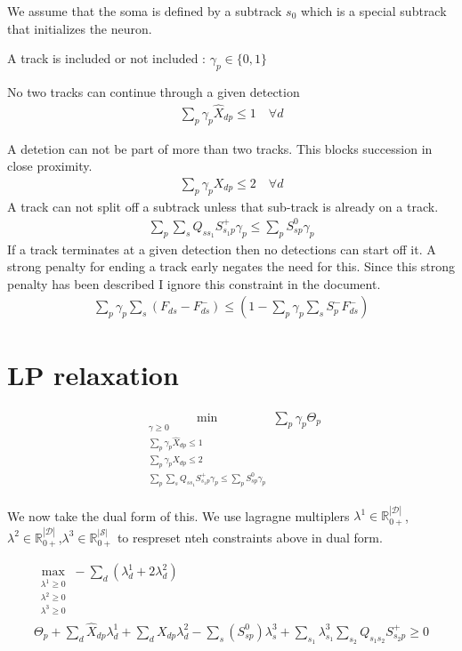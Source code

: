 \documentclass{article}
\begin{document}
We assume that the soma is defined by a subtrack $s_0$ which is a special subtrack that initializes the neuron.  
 
 A track is included or not included :  $\gamma_p \in \{0,1\}$
 
 No two tracks can continue through a given detection
 \begin{align}
 \sum_p \gamma_p\hat{X}_{dp}\leq 1 \quad \forall d
 \end{align}
 
 A detetion can not be part of more than two tracks.  This blocks succession in close proximity.  
  \begin{align}
 \sum_p \gamma_p X_{dp}\leq 2 \quad \forall d
 \end{align}
%
 A track can not split off a subtrack unless that sub-track is already on a track. 
 \begin{align}
 \sum_p \sum_{s}Q_{ss_1}S^+_{s_1p}\gamma_p \leq \sum_p S^0_{sp}\gamma_p %
 \end{align}
 If a track terminates at a given detection then no detections can start off it.  A strong penalty for ending a track early negates the need for this.  Since this strong penalty has been described  I ignore this constraint in the document.  
 \begin{align}
\sum_p\gamma_p\sum_s(F_{ds}-F^-_{ds}) \leq (1-\sum_p\gamma_p\sum_s S^-_pF^-_{ds})
 \end{align}
 
 \section{LP relaxation}
 
  \begin{align}
 \min_{\substack{\gamma \geq 0\\   \sum_p \gamma_p\hat{X}_{dp}\leq 1\\ \sum_p \gamma_p X_{dp}\leq 2 \\ \sum_p \sum_{s}Q_{ss_1}S^+_{s_1p}\gamma_p \leq \sum_p S^0_{sp}\gamma_p }}\sum_p \gamma_p\Theta_p
 \end{align}
 
 We now take the dual form of this.  We use lagragne multiplers $\lambda^1 \in \mathbb{R}_{0+}^{|\mathcal{D}|}$,$\lambda^2 \in \mathbb{R}_{0+}^{|\mathcal{D}|}$,$\lambda^3 \in \mathbb{R}_{0+}^{|\mathcal{S}|}$ to respreset nteh constraints above in dual form.  
 
 \begin{align}
 \max_{\substack{\lambda^1 \geq 0\\ \lambda^2 \geq 0 \\ \lambda^3 \geq 0 }}-\sum_d(\lambda^1_d+2\lambda^2_d) \\
 \Theta_p +\sum_d \hat{X}_{dp}\lambda^1_d+\sum_d X_{dp}\lambda^2_d -\sum_{s}(S^0_{sp})\lambda^3_s+ \sum_{s_1} \lambda^3_{s_1}\sum_{s_2}Q_{s_1s_2}S^+_{s_2p}\geq 0
 \end{align}
 
\end{document}
